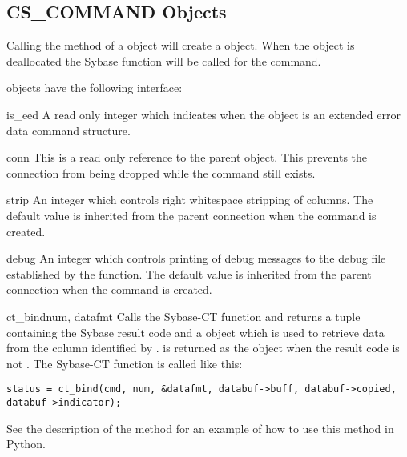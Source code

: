 \subsection{CS_COMMAND Objects}

Calling the  method of a 
object will create a  object.  When the
 object is deallocated the Sybase
 function will be called for the command.

 objects have the following interface:

\begin{memberdesc}[CS_COMMAND]{is_eed}
A read only integer which indicates when the  object
is an extended error data command structure.
\end{memberdesc}

\begin{memberdesc}[CS_COMMAND]{conn}
This is a read only reference to the parent 
object.  This prevents the connection from being dropped while the
command still exists.
\end{memberdesc}

\begin{memberdesc}[CS_COMMAND]{strip}
An integer which controls right whitespace stripping of 
columns.  The default value is inherited from the parent connection
when the command is created.
\end{memberdesc}

\begin{memberdesc}[CS_COMMAND]{debug}
An integer which controls printing of debug messages to the debug file
established by the  function.  The default value
is inherited from the parent connection when the command is created.
\end{memberdesc}

\begin{methoddesc}[CS_COMMAND]{ct_bind}{num, datafmt}
Calls the Sybase-CT  function and returns a tuple
containing the Sybase result code and a  object which
is used to retrieve data from the column identified by .
 is returned as the  object when the result
code is not .  The Sybase-CT 
function is called like this:

\begin{verbatim}
status = ct_bind(cmd, num, &datafmt, databuf->buff, databuf->copied, databuf->indicator);
\end{verbatim}

See the description of the  method for an
example of how to use this method in Python.
\end{methoddesc}

